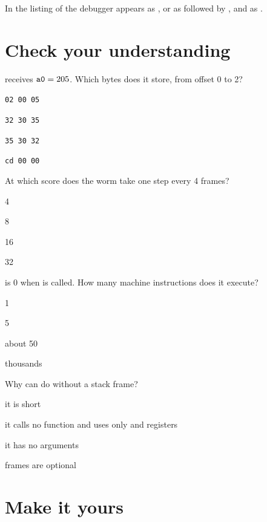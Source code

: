 In the listing of the debugger  appears as , or as
 followed by , and  as .



\section{Check your understanding}

\begin{quiz}{ receives $\texttt{a0}=205$. Which bytes does it store, from offset 0 to 2?}
\item \texttt{02 00 05}
\item \texttt{32 30 35}
\item \texttt{35 30 32}
\item \texttt{cd 00 00}
\end{quiz}

\begin{quiz}{At which score does the worm take one step every 4 frames?}
\item 4
\item 8
\item 16
\item 32
\end{quiz}

\begin{quiz}{ is 0 when  is called. How many machine instructions does it execute?}
\item 1
\item 5
\item about 50
\item thousands
\end{quiz}

\begin{quiz}{Why can  do without a stack frame?}
\item it is short
\item it calls no function and uses only  and  registers
\item it has no arguments
\item frames are optional
\end{quiz}

\section{Make it yours}


